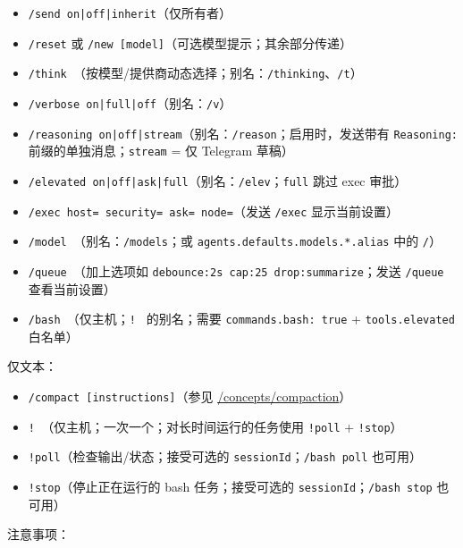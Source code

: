 \begin{itemize}
  \item \texttt{/send on|off|inherit}（仅所有者）
  \item \texttt{/reset} 或 \texttt{/new [model]}（可选模型提示；其余部分传递）
  \item \texttt{/think }（按模型/提供商动态选择；别名：\texttt{/thinking}、\texttt{/t}）
  \item \texttt{/verbose on|full|off}（别名：\texttt{/v}）
  \item \texttt{/reasoning on|off|stream}（别名：\texttt{/reason}；启用时，发送带有 \texttt{Reasoning:} 前缀的单独消息；\texttt{stream} = 仅 Telegram 草稿）
  \item \texttt{/elevated on|off|ask|full}（别名：\texttt{/elev}；\texttt{full} 跳过 exec 审批）
  \item \texttt{/exec host= security= ask= node=}（发送 \texttt{/exec} 显示当前设置）
  \item \texttt{/model }（别名：\texttt{/models}；或 \texttt{agents.defaults.models.*.alias} 中的 \texttt{/}）
  \item \texttt{/queue }（加上选项如 \texttt{debounce:2s cap:25 drop:summarize}；发送 \texttt{/queue} 查看当前设置）
  \item \texttt{/bash }（仅主机；\texttt{! } 的别名；需要 \texttt{commands.bash: true} + \texttt{tools.elevated} 白名单）
\end{itemize}


仅文本：

\begin{itemize}
  \item \texttt{/compact [instructions]}（参见 \href{/concepts/compaction}{/concepts/compaction}）
  \item \texttt{! }（仅主机；一次一个；对长时间运行的任务使用 \texttt{!poll} + \texttt{!stop}）
  \item \texttt{!poll}（检查输出/状态；接受可选的 \texttt{sessionId}；\texttt{/bash poll} 也可用）
  \item \texttt{!stop}（停止正在运行的 bash 任务；接受可选的 \texttt{sessionId}；\texttt{/bash stop} 也可用）
\end{itemize}


注意事项：

